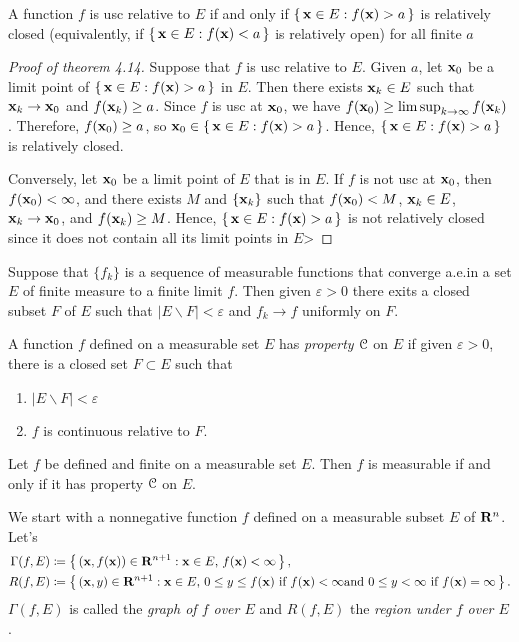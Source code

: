 \begin{theorem*}[4.14]
A function $f$ is usc relative to $E$ if and only if $\left\{\,\mathbf{x}\in
  E:f(\mathbf{x})>a\,\right\}$ is relatively closed (equivalently, if
$\left\{\,\mathbf{x}\in E:f(\mathbf{x})<a\,\right\}$ is relatively open) for all finite
$a$
\end{theorem*}
\begin{proof}[Proof of theorem 4.14]
Suppose that $f$ is usc relative to $E$. Given $a$, let $\mathbf{x}_0$ be a limit
point of $\left\{\,\mathbf{x}\in E:f(\mathbf{x})>a\,\right\}$ in $E$. Then there exists
$\mathbf{x}_k\in E$ such that $\mathbf{x}_k\to\mathbf{x}_0$ and $f(\mathbf{x}_k)\geq a$. Since $f$
is usc at $\mathbf{x}_0$, we have $f(\mathbf{x}_0)\geq\limsup_{k\to\infty}
f(\mathbf{x}_k)$. Therefore, $f(\mathbf{x}_0)\geq a$, so $\mathbf{x}_0\in\left\{\,\mathbf{x}\in
  E:f(\mathbf{x})>a\,\right\}$. Hence, $\left\{\,\mathbf{x}\in E:f(\mathbf{x})>a\,\right\}$
is relatively closed.

Conversely, let $\mathbf{x}_0$ be a limit point of $E$ that is in $E$. If $f$ is
not usc at $\mathbf{x}_0$, then $f(\mathbf{x}_0)<\infty$, and there exists $M$ and
$\left\{ \mathbf{x}_k \right\}$ such that $f(\mathbf{x}_0)<M$, $\mathbf{x}_k\in E$,
$\mathbf{x}_k\to\mathbf{x}_0$, and $f(\mathbf{x}_k)\geq M$. Hence, $\left\{\,\mathbf{x}\in
  E:f(\mathbf{x})>a\,\right\}$ is not relatively closed since it does not contain
all its limit points in $E$>
\end{proof}
\begin{theorem*}
Suppose that $\{f_k\}$ is a sequence of measurable functions that converge
a.e.\@ in a set $E$ of finite measure to a finite limit $f$. Then given
$\varepsilon>0$ there exits a closed subset $F$ of $E$ such that $|E\smallsetminus
F|<\varepsilon$ and $f_k\to f$ uniformly on $F$.
\end{theorem*}
A function $f$ defined on a measurable set $E$ has \emph{property $\mathcal{C}$}
on $E$ if given $\varepsilon>0$, there is a closed set $F\subset E$ such
that
\begin{enumerate}[label=(\roman*)]
\item $|E\smallsetminus F|<\varepsilon$
\item $f$ is continuous relative to $F$.
\end{enumerate}
\begin{theorem*}
Let $f$ be defined and finite on a measurable set $E$. Then $f$ is
measurable if and only if it has property $\mathcal{C}$ on $E$.
\end{theorem*}

We start with a nonnegative function $f$ defined on a measurable subset $E$
of $\mathbf{R}^n$. Let's
\begin{equation}
\label{eq:graph-and-region}
\begin{aligned}
\Gamma(f,E)&\coloneqq\left\{\,(\mathbf{x},f(\mathbf{x}))\in\mathbf{R}^{n+1}:\text{$\mathbf{x}\in
    E$, $f(\mathbf{x})<\infty$}\,\right\},\\
R(f,E)&\coloneqq\left\{\,(\mathbf{x},y)\in\mathbf{R}^{n+1}:\text{$\mathbf{x}\in E$, $0\leq
    y\leq f(\mathbf{x})$ if $f(\mathbf{x})<\infty$and $0\leq y<\infty$ if
    $f(\mathbf{x})=\infty$}\,\right\}.
\end{aligned}
\end{equation}
$\Gamma(f,E)$ is called the \emph{graph of $f$ over $E$} and $R(f,E)$ the
\emph{region under $f$ over $E$}.

